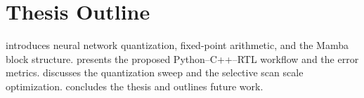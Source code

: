 \section{Thesis Outline}

 introduces neural network quantization, fixed-point arithmetic, and the Mamba block structure.  presents the proposed Python--C++--RTL workflow and the error metrics.  discusses the quantization sweep and the selective scan scale optimization.  concludes the thesis and outlines future work.

